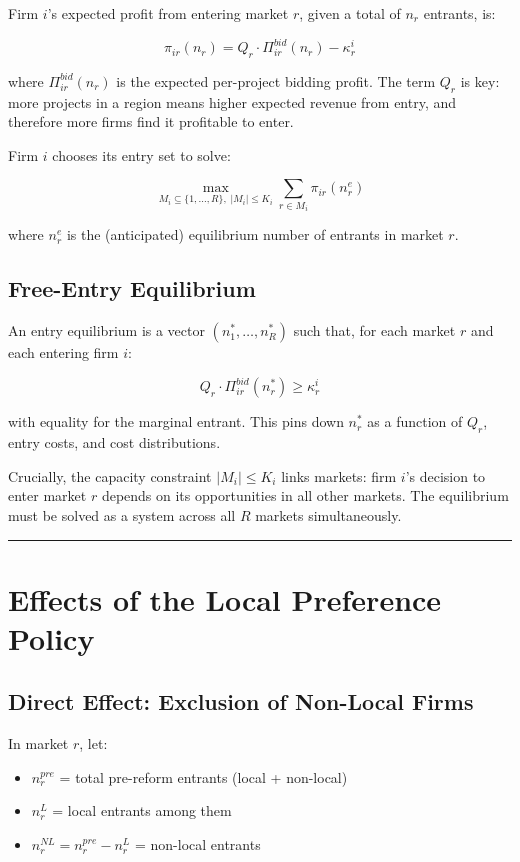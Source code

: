 \documentclass[10pt]{article}
\begin{document}
Firm $i$'s expected profit from entering market $r$, given a total of $n_r$ entrants, is:

\[
  \pi_{ir}(n_r) = Q_r \cdot \Pi_{ir}^{bid}(n_r) - \kappa_r^i
\]

where $\Pi_{ir}^{bid}(n_r)$ is the expected per-project bidding profit. The term $Q_r$ is key: more projects in a region means higher expected revenue from entry, and therefore more firms find it profitable to enter.

Firm $i$ chooses its entry set to solve:

\[
  \max_{M_i \subseteq \{1,\dots,R\},\; |M_i| \leq K_i}
    \sum_{r \in M_i} \pi_{ir}(n_r^e)
\]

where $n_r^e$ is the (anticipated) equilibrium number of entrants in market $r$.

\subsection{Free-Entry Equilibrium}

An entry equilibrium is a vector $(n_1^*, \dots, n_R^*)$ such that, for each market $r$ and each entering firm $i$:

\[
  Q_r \cdot \Pi_{ir}^{bid}(n_r^*) \geq \kappa_r^i
\]

with equality for the marginal entrant. This pins down $n_r^*$ as a function of $Q_r$, entry costs, and cost distributions.

Crucially, the capacity constraint $|M_i| \leq K_i$ links markets: firm $i$'s decision to enter market $r$ depends on its opportunities in all other markets. The equilibrium must be solved as a system across all $R$ markets simultaneously.

\bigskip\hrule\bigskip

\section{Effects of the Local Preference Policy}

\subsection{Direct Effect: Exclusion of Non-Local Firms}

In market $r$, let:
\begin{itemize}
  \item $n_r^{pre}$ = total pre-reform entrants (local + non-local)
  \item $n_r^{L}$ = local entrants among them
  \item $n_r^{NL} = n_r^{pre} - n_r^{L}$ = non-local entrants
\end{itemize}
\end{document}
